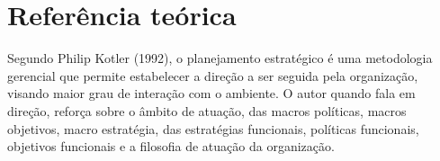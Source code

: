 \documentclass[
	12pt,				%
	openright,			%
	oneside,			%
	a4paper,			%
	english,			%
	french,				%
	spanish,			%
	brazil				%
	]{abntex2}
\begin{document}
\pagebreak



\listoffigures*
\cleardoublepage

\listoftables*
\cleardoublepage


  


\tableofcontents*
\cleardoublepage

\textual



\chapter[Referência teórica]{Referência teórica}
	
	Segundo Philip Kotler (1992), o planejamento estratégico é uma metodologia gerencial que permite estabelecer a direção a ser seguida pela organização, visando maior grau de interação com o ambiente. O autor quando fala em direção, reforça sobre o âmbito de atuação, das macros políticas, macros objetivos, macro estratégia, das estratégias funcionais, políticas funcionais, objetivos funcionais e a filosofia de atuação da organização.
	
\end{document}
